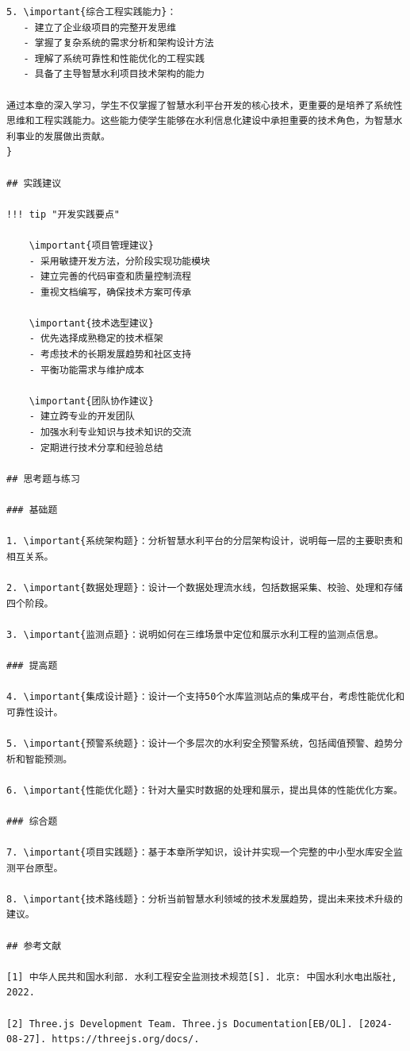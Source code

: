 \begin{verbatim}
5. \important{综合工程实践能力}：
   - 建立了企业级项目的完整开发思维
   - 掌握了复杂系统的需求分析和架构设计方法
   - 理解了系统可靠性和性能优化的工程实践
   - 具备了主导智慧水利项目技术架构的能力

通过本章的深入学习，学生不仅掌握了智慧水利平台开发的核心技术，更重要的是培养了系统性思维和工程实践能力。这些能力使学生能够在水利信息化建设中承担重要的技术角色，为智慧水利事业的发展做出贡献。
}

## 实践建议

!!! tip "开发实践要点"
    
    \important{项目管理建议}
    - 采用敏捷开发方法，分阶段实现功能模块
    - 建立完善的代码审查和质量控制流程
    - 重视文档编写，确保技术方案可传承
    
    \important{技术选型建议}
    - 优先选择成熟稳定的技术框架
    - 考虑技术的长期发展趋势和社区支持
    - 平衡功能需求与维护成本
    
    \important{团队协作建议}
    - 建立跨专业的开发团队
    - 加强水利专业知识与技术知识的交流
    - 定期进行技术分享和经验总结

## 思考题与练习

### 基础题

1. \important{系统架构题}：分析智慧水利平台的分层架构设计，说明每一层的主要职责和相互关系。

2. \important{数据处理题}：设计一个数据处理流水线，包括数据采集、校验、处理和存储四个阶段。

3. \important{监测点题}：说明如何在三维场景中定位和展示水利工程的监测点信息。

### 提高题

4. \important{集成设计题}：设计一个支持50个水库监测站点的集成平台，考虑性能优化和可靠性设计。

5. \important{预警系统题}：设计一个多层次的水利安全预警系统，包括阈值预警、趋势分析和智能预测。

6. \important{性能优化题}：针对大量实时数据的处理和展示，提出具体的性能优化方案。

### 综合题

7. \important{项目实践题}：基于本章所学知识，设计并实现一个完整的中小型水库安全监测平台原型。

8. \important{技术路线题}：分析当前智慧水利领域的技术发展趋势，提出未来技术升级的建议。

## 参考文献

[1] 中华人民共和国水利部. 水利工程安全监测技术规范[S]. 北京: 中国水利水电出版社, 2022.

[2] Three.js Development Team. Three.js Documentation[EB/OL]. [2024-08-27]. https://threejs.org/docs/.


\end{verbatim}
